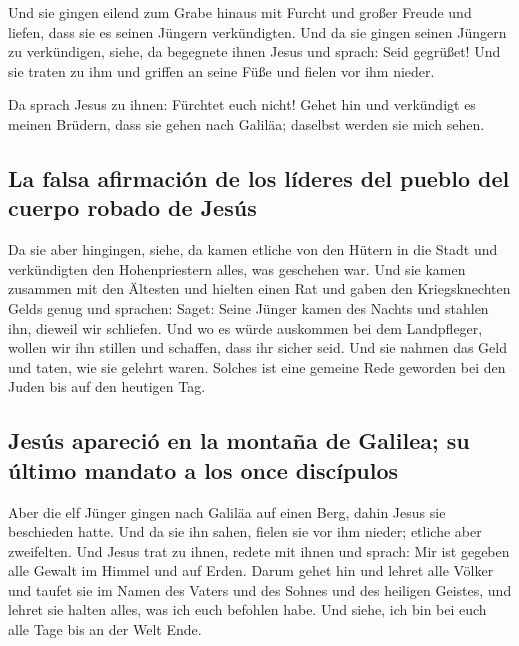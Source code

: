  Und sie gingen eilend zum Grabe hinaus mit Furcht und
großer Freude und liefen, dass sie es seinen Jüngern verkündigten. Und
da sie gingen seinen Jüngern zu verkündigen,  siehe, da
begegnete ihnen Jesus und sprach: Seid gegrüßet! Und sie traten zu ihm
und griffen an seine Füße und fielen vor ihm nieder.

 Da sprach Jesus zu ihnen: Fürchtet euch nicht! Gehet hin
und verkündigt es meinen Brüdern, dass sie gehen nach Galiläa; daselbst
werden sie mich sehen.

\hypertarget{la-falsa-afirmaciuxf3n-de-los-luxedderes-del-pueblo-del-cuerpo-robado-de-jesuxfas}{%
\subsection{La falsa afirmación de los líderes del pueblo del cuerpo
robado de
Jesús}\label{la-falsa-afirmaciuxf3n-de-los-luxedderes-del-pueblo-del-cuerpo-robado-de-jesuxfas}}

 Da sie aber hingingen, siehe, da kamen etliche von den
Hütern in die Stadt und verkündigten den Hohenpriestern alles, was
geschehen war.  Und sie kamen zusammen mit den Ältesten
und hielten einen Rat und gaben den Kriegsknechten Gelds genug
 und sprachen: Saget: Seine Jünger kamen des Nachts und
stahlen ihn, dieweil wir schliefen.  Und wo es würde
auskommen bei dem Landpfleger, wollen wir ihn stillen und schaffen, dass
ihr sicher seid.  Und sie nahmen das Geld und taten, wie
sie gelehrt waren. Solches ist eine gemeine Rede geworden bei den Juden
bis auf den heutigen Tag.

\hypertarget{jesuxfas-apareciuxf3-en-la-montauxf1a-de-galilea-su-uxfaltimo-mandato-a-los-once-discuxedpulos}{%
\subsection{Jesús apareció en la montaña de Galilea; su último mandato a
los once
discípulos}\label{jesuxfas-apareciuxf3-en-la-montauxf1a-de-galilea-su-uxfaltimo-mandato-a-los-once-discuxedpulos}}

 Aber die elf Jünger gingen nach Galiläa auf einen Berg,
dahin Jesus sie beschieden hatte.  Und da sie ihn sahen,
fielen sie vor ihm nieder; etliche aber zweifelten.  Und
Jesus trat zu ihnen, redete mit ihnen und sprach: Mir ist gegeben alle
Gewalt im Himmel und auf Erden.  Darum gehet hin und
lehret alle Völker und taufet sie im Namen des Vaters und des Sohnes und
des heiligen Geistes,  und lehret sie halten alles, was
ich euch befohlen habe. Und siehe, ich bin bei euch alle Tage bis an der
Welt Ende.

